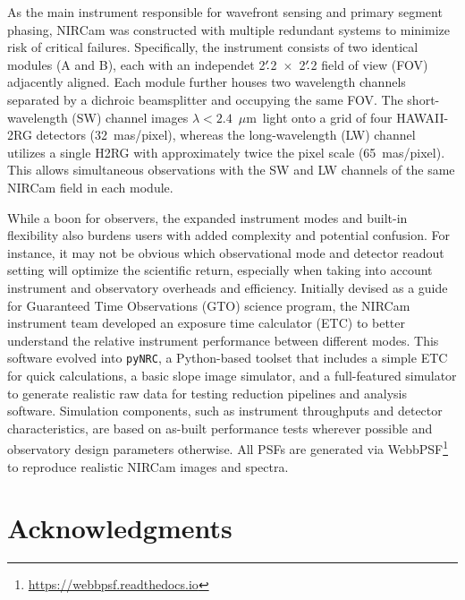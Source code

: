 \documentclass[]{emulateapj}
\newcommand{\pynrc}{\texttt{\MakeLowercase{py}NRC}}
\def\ptmin{$^{\prime}\mskip-4.0mu.$}
\newcommand{\um}{$\mu$m}
\begin{document}
As the main instrument responsible for wavefront sensing and primary segment phasing, NIRCam was constructed with multiple redundant systems to minimize risk of critical failures. Specifically, the instrument consists of two identical modules (A and B), each with an independet 2\ptmin2~$\times$~2\ptmin2 field of view (FOV) adjacently aligned. Each module further houses two wavelength channels separated by a dichroic beamsplitter and occupying the same FOV. The short-wavelength (SW) channel images $\lambda<2.4$~\um\ light onto a grid of four HAWAII-2RG \citep[H2RG;][]{bele08} detectors (32~mas/pixel), whereas the long-wavelength (LW) channel utilizes a single H2RG with approximately twice the pixel scale (65~mas/pixel). This allows simultaneous observations with the SW and LW channels of the same NIRCam field in each module.

While a boon for observers, the expanded instrument modes and built-in flexibility also burdens users with added complexity and potential confusion. For instance, it may not be obvious which observational mode and detector readout setting will optimize the scientific return, especially when taking into account instrument and observatory overheads and efficiency. Initially devised as a guide for Guaranteed Time Observations (GTO) science program, the NIRCam instrument team developed an exposure time calculator (ETC) to better understand the relative instrument performance between different modes. This software evolved into \pynrc, a Python-based toolset that includes a simple ETC for quick calculations, a basic slope image simulator, and a full-featured simulator to generate realistic raw data for testing reduction pipelines and analysis software. Simulation components, such as instrument throughputs and detector characteristics, are based on as-built performance tests wherever possible and observatory design parameters otherwise. All PSFs are generated via WebbPSF\footnote{\url{https://webbpsf.readthedocs.io}} \citep{perr12,perr14} to reproduce realistic NIRCam images and spectra. 

\acknowledgments
\section*{Acknowledgments}



\clearpage





\end{document}

